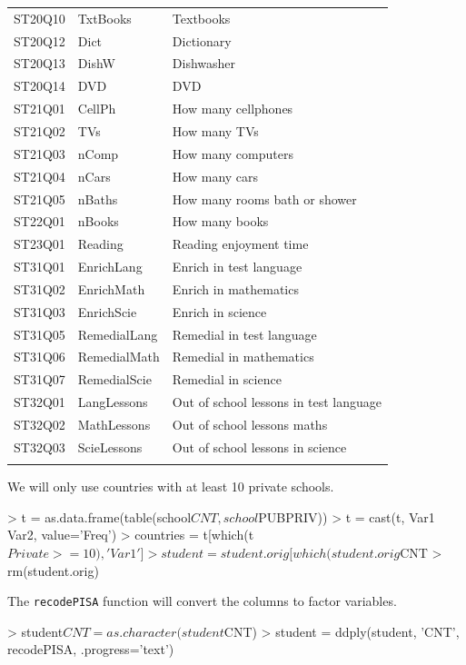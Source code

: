 \documentclass[nojss]{jss}
\begin{document}
\begin{longtable}{lll}
  ST20Q10 & TxtBooks & Textbooks \\ 
  ST20Q12 & Dict & Dictionary \\ 
  ST20Q13 & DishW & Dishwasher \\ 
  ST20Q14 & DVD & DVD \\ 
  ST21Q01 & CellPh & How many cellphones \\ 
  ST21Q02 & TVs & How many TVs \\ 
  ST21Q03 & nComp & How many computers \\ 
  ST21Q04 & nCars & How many cars \\ 
  ST21Q05 & nBaths & How many rooms bath or shower \\ 
  ST22Q01 & nBooks & How many books \\ 
  ST23Q01 & Reading & Reading enjoyment time \\ 
  ST31Q01 & EnrichLang & Enrich in test language \\ 
  ST31Q02 & EnrichMath & Enrich in mathematics \\ 
  ST31Q03 & EnrichScie & Enrich in science \\ 
  ST31Q05 & RemedialLang & Remedial in test language \\ 
  ST31Q06 & RemedialMath & Remedial in mathematics \\ 
  ST31Q07 & RemedialScie & Remedial in science \\ 
  ST32Q01 & LangLessons & Out of school lessons in test language \\ 
  ST32Q02 & MathLessons & Out of school lessons maths \\ 
  ST32Q03 & ScieLessons & Out of school lessons in science \\ 
   \hline
\hline
\label{covariates}
\end{longtable}
We will only use countries with at least 10 private schools.

\begin{Schunk}
\begin{Sinput}
> t = as.data.frame(table(school$CNT, school$PUBPRIV))
> t = cast(t, Var1 ~ Var2, value='Freq')
> countries = t[which(t$Private >= 10), 'Var1']
> student = student.orig[which(student.orig$CNT %
> rm(student.orig)
\end{Sinput}
\end{Schunk}

The \texttt{recodePISA} function will convert the columns to factor variables.

\begin{Schunk}
\begin{Sinput}
> student$CNT = as.character(student$CNT)
> student = ddply(student, 'CNT', recodePISA, .progress='text')
\end{Sinput}
\end{Schunk}
\end{document}
